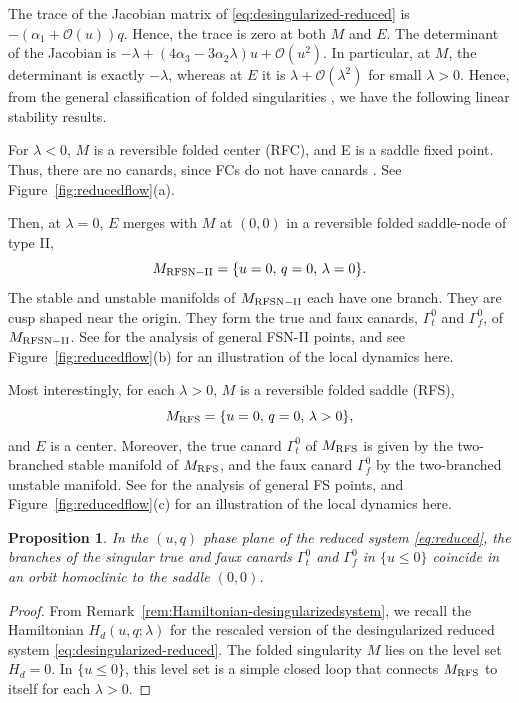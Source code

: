 \documentclass[11pt]{article}
\numberwithin{equation}{section}
\newtheorem{proposition}{Proposition}[section]
\begin{document}
The trace of the Jacobian matrix of \eqref{eq:desingularized-reduced} is $-(\alpha_1 + \mathcal{O}(u))q$. 
Hence, the trace is zero at both $M$ and $E$.
The determinant of the Jacobian is $-\lambda + (4\alpha_3 -3\alpha_2\lambda)u + \mathcal{O}(u^2)$.
In particular, at $M$, the determinant is exactly $-\lambda$, whereas at $E$ it is $\lambda + \mathcal{O}(\lambda^2)$ for small $\lambda>0$.
Hence, from the general classification of folded singularities \cite{B1983,KW2010,SW2001}, we have the following linear stability results.

For $\lambda<0$, $M$ is a reversible folded center (RFC), and E is a saddle fixed point.
Thus, there are no canards, since FCs do not have canards \cite{SW2001}.
See Figure~\ref{fig:reducedflow}(a).

Then, at $\lambda=0$, $E$ merges with $M$ at $(0,0)$ in a reversible folded saddle-node of type II,
\begin{equation}
\label{eq:M-RFSNII}
M_{\rm RFSN-II} = \{ u=0, \, q=0, \, \lambda=0 \}.
\end{equation}
The stable and unstable manifolds of $M_{\rm RFSN-II}$ each have one branch.
They are cusp shaped near the origin.
They form the true and faux canards, $\Gamma_{t}^0$ and $\Gamma_{f}^0$, of $M_{\rm  RFSN-II}$. 
See \cite{KW2010} for the analysis of general FSN-II points, and see Figure~\ref{fig:reducedflow}(b) for an illustration of the local dynamics here.

Most interestingly, for each $\lambda>0$, $M$ is a reversible folded saddle (RFS),
\begin{equation}\label{eq:M-RFS} 
M_{\rm RFS}=\{ u=0, \, q=0, \, \lambda>0 \},
\end{equation}
and $E$ is a center.
Moreover, the true canard $\Gamma_t^0$ of $M_{\rm RFS}$ is given by the two-branched stable manifold of $M_{\rm RFS}$, and the faux canard $\Gamma_f^0$ by the two-branched unstable manifold.
See \cite{B1983,SW2001,MW2017} for the analysis of general FS points, and 
Figure~\ref{fig:reducedflow}(c) for an illustration of the local dynamics here.

\begin{proposition}\label{prop:singularcanardsconnect}
In the $(u,q)$ phase plane of the reduced system \eqref{eq:reduced}, the branches of the singular true and faux canards $\Gamma_t^0$ and $\Gamma_f^0$ in $\{ u\le 0\}$ coincide in an orbit homoclinic to the saddle $(0,0)$.
\end{proposition}

\begin{proof}
From Remark~\ref{rem:Hamiltonian-desingularizedsystem},
we recall the Hamiltonian $H_d(u,q;\lambda)$ for the rescaled version of the  desingularized reduced system \eqref{eq:desingularized-reduced}. 
The folded singularity $M$ lies on the level set $H_d=0$.
In $\{ u \leq 0 \}$, this level set is a simple closed loop that connects $M_{\rm RFS}$ to itself for each $\lambda>0$. 
\end{proof}
\end{document}
